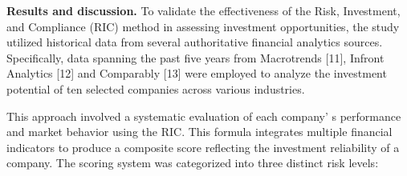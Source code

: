 {%

{\bfseries Results and discussion.} To validate the effectiveness of the
Risk, Investment, and Compliance (RIC) method in assessing investment
opportunities, the study utilized historical data from several
authoritative financial analytics sources. Specifically, data spanning
the past five years from Macrotrends {[}11{]}, Infront Analytics
{[}12{]} and Comparably {[}13{]} were employed to analyze the investment
potential of ten selected companies across various industries.

This approach involved a systematic evaluation of each
company' s performance and market behavior using the RIC.
This formula integrates multiple financial indicators to produce a
composite score reflecting the investment reliability of a company. The
scoring system was categorized into three distinct risk levels:

}
